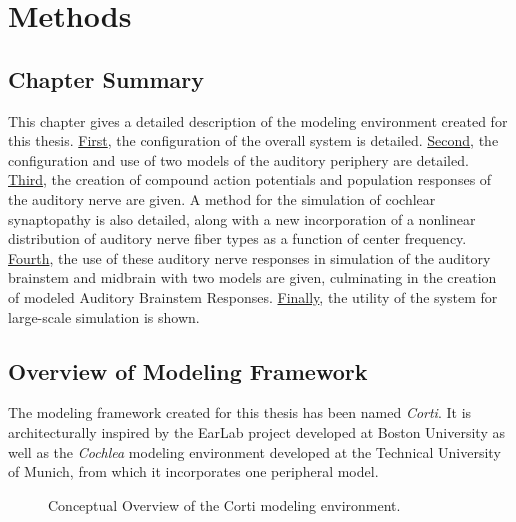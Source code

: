 \chapter{Methods}
\label{chapter:Methods}
\thispagestyle{myheadings}

\graphicspath{{4_Methods/Figures/}}

\section{Chapter Summary} %
\label{sec:methodsummary}
This chapter gives a detailed description of the modeling environment created for this thesis.  \hyperref[sec:overview_of_modeling_framework]{First}, the configuration of the overall system is detailed.  \hyperref[sec:peripheral_models]{Second}, the configuration and use of two models of the auditory periphery are detailed.  \hyperref[sec:auditory_nerve_response_models]{Third}, the creation of compound action potentials and population responses of the auditory nerve are given.  A method for the simulation of cochlear synaptopathy is also detailed, along with a new incorporation of a nonlinear distribution of auditory nerve fiber types as a function of center frequency.  \hyperref[sec:brainstem_models]{Fourth}, the use of these auditory nerve responses in simulation of the auditory brainstem and midbrain with two models are given, culminating in the creation of modeled Auditory Brainstem Responses.  \hyperref[sub:automated_parameter_exploration]{Finally}, the utility of the system for large-scale simulation is shown. 

\section{Overview of Modeling Framework} %
\label{sec:overview_of_modeling_framework}
The modeling framework created for this thesis has been named \emph{Corti}\citep{Voysey2016Corti}. It is architecturally inspired by the EarLab project developed at Boston University as well as the \emph{Cochlea}\citep{Rudnicki2014Cochlea} modeling environment developed at the Technical University of Munich, from which it incorporates one peripheral model. 

\begin{figure}[htbp]
	\centering
	\caption{Conceptual Overview of the Corti modeling environment.}
	\label{fig:corti-overview}
	\end{figure}

